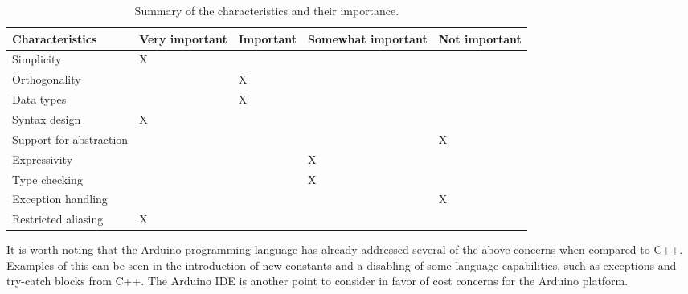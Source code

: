 \begin{table}[htb]
    \centering
    \begin{tabular}{l>{\centering}p{2cm}>{\centering}p{2cm}>{\centering}p{2cm}>{\centering\arraybackslash}p{2cm}}
        \toprule
        \textbf{Characteristics}    &
        \textbf{Very important}     &
        \textbf{Important}          &
        \textbf{Somewhat important} &
        \textbf{Not important}                      \\ \midrule
        Simplicity                  & X &   &   &   \\
        Orthogonality               &   & X &   &   \\
        Data types                  &   & X &   &   \\
        Syntax design               & X &   &   &   \\
        Support for abstraction     &   &   &   & X \\
        Expressivity                &   &   & X &   \\
        Type checking               &   &   & X &   \\
        Exception handling          &   &   &   & X \\
        Restricted aliasing         & X &   &   &   \\
        \bottomrule
    \end{tabular}
    \caption{Summary of the characteristics and their importance.}
    \label{tab:priorityofcharacteristics}
\end{table}


It is worth noting that the Arduino programming language has already addressed several of the above concerns when compared to C++. Examples of this can be seen in the introduction of new constants and a disabling of some language capabilities, such as exceptions and try-catch blocks from C++. The Arduino IDE is another point to consider in favor of cost concerns for the Arduino platform.
